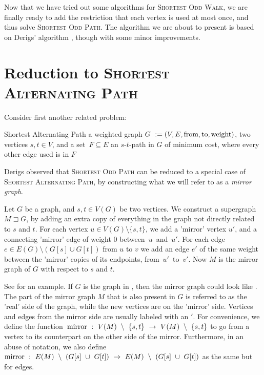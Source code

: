 Now that we have tried out some algorithms for \textsc{Shortest Odd Walk}, we are finally ready to add the restriction that each vertex is used at most once, and thus solve \textsc{Shortest Odd Path}. The algorithm we are about to present is based on Derigs' algorithm \cite{source:derigs_shortest_odd_path}, though with some minor improvements.

\section{Reduction to \textsc{Shortest Alternating Path}}
\label{subsection:reduction}
Consider first another related problem:

\problem
{Shortest Alternating Path}
{a weighted graph $G~:= (V, E, \operatorname{from}, \operatorname{to}, \operatorname{weight})$, two vertices $s,t \in V$, and a set~$F \subseteq E$}
{an $s$-$t$-path in $G$ of minimum cost, where every other edge used is in $F$}

Derigs observed that \textsc{Shortest Odd Path} can be reduced to a special case of \textsc{Shortest Alternating Path}, by constructing what we will refer to as a \emph{mirror graph}. 

\begin{definition}
    \label{def:mirror-graph}
    Let $G$ be a graph, and $s,t \in V(G)$ be two vertices. We construct a supergraph $M \sqsupset G$, by adding an extra copy of everything in the graph not directly related to $s$ and $t$. For each vertex $u \in V(G) \setminus \{s,t\}$, we add a 'mirror' vertex $u'$, and a connecting 'mirror' edge of weight 0 between~$u$~and~$u'$. For each edge $e \in E(G) \setminus (G[s] \cup G[t])$ from $u$ to $v$ we add an edge $e'$ of the same weight between the 'mirror' copies of its endpoints, from~$u'$~to~$v'$.
    Now $M$ is the mirror graph of $G$ with respect to $s$ and $t$.
\end{definition}

See  for an example. If $G$ is the graph in , then the mirror graph could look like . The part of the mirror graph $M$ that is also present in $G$ is referred to as the 'real' side of the graph, while the new vertices are on the 'mirror' side. Vertices and edges from the mirror side are usually labeled with an $'$. For convenience, we define the function~$\operatorname{mirror}~:~V(M)~\setminus~\{s,t\}~\rightarrow~V(M)~\setminus~\{s,t\}$ to go from a vertex to its counterpart on the other side of the mirror. Furthermore, in an abuse of notation, we also define~$\operatorname{mirror}~:~E(M)~\setminus~(G[s]~\cup~G[t])~\rightarrow~E(M)~\setminus~(G[s]~\cup~G[t])$ as the same but for edges.

